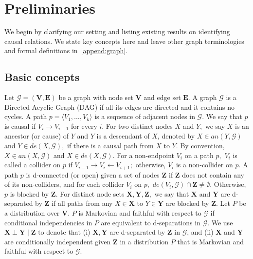 \documentclass{article}
\begin{document}
\section{Preliminaries}
\label{sec:preliminaries}
We begin by clarifying our setting and listing existing results on identifying causal relations.
We state key concepts here and leave other graph terminologies and formal definitions in~\ref{append:graph}.


\subsection{Basic concepts}
Let $\mathcal{G}=(\mathbf{V},\mathbf{E})$ be a graph with node set $\mathbf{V}$ and edge set $\mathbf{E}.$
A graph $\mathcal{G}$ is a Directed Acyclic Graph (DAG) if all its edges are directed and it contains no cycles.
A path $p=\langle V_1,\dots,V_k \rangle$ is a sequence of adjacent nodes in $\mathcal{G}$.
We say that $p$ is causal if $V_i\to V_{i+1}$ for every $i.$
For two distinct nodes $X$ and $Y,$ we say $X$ is an ancestor (or cause) of $Y$ and $Y$ is a descendant of $X$, denoted by $X\in an(Y,\mathcal{G})$ and $Y\in de(X,\mathcal{G}),$ if there is a causal path from $X$ to $Y.$
By convention, $X\in an(X,\mathcal{G})$ and $X\in de(X,\mathcal{G}).$
For a non-endpoint $V_i$ on a path $p,$ $V_i$ is called a collider on $p$ if $V_{i-1}\to V_i\leftarrow V_{i+1};$ otherwise, $V_i$ is a non-collider on $p.$
A path $p$ is d-connected (or open) given a set of nodes $\mathbf{Z}$ if $\mathbf{Z}$ does not contain any of its non-colliders, and for each collider $V_i$ on $p,$ $de(V_i,\mathcal{G})\cap \mathbf{Z}\neq \emptyset.$
Otherwise, $p$ is blocked by $\mathbf{Z}.$
For distinct node sets $\mathbf{X},\mathbf{Y},\mathbf{Z},$ we say that $\mathbf{X}$ and $\mathbf{Y}$ are d-separated by $\mathbf{Z}$ if all paths from any $X\in \mathbf{X}$ to $Y\in \mathbf{Y}$ are blocked by $\mathbf{Z}.$
Let $P$ be a distribution over $\mathbf{V}.$ $P$ is Markovian and faithful with respect to $\mathcal{G}$ if conditional independencies in $P$ are equivalent to d-separations in $\mathcal{G}.$
We use $\mathbf{X}\perp \mathbf{Y} \mid \mathbf{Z}$ to denote that (i) $\mathbf{X},\mathbf{Y}$ are d-separated by $\mathbf{Z}$ in $\mathcal{G}$, and (ii) $\mathbf{X}$ and $\mathbf{Y}$ are conditionally independent given $\mathbf{Z}$ in a distribution $P$ that is Markovian and faithful with respect to $\mathcal{G}.$
\end{document}
